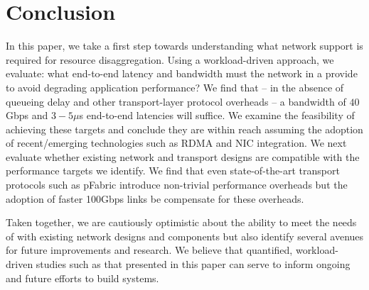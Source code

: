 \section{Conclusion}
In this paper, we take a first step towards understanding what network support is required for resource disaggregation. Using a workload-driven approach, we evaluate: what end-to-end latency and bandwidth must the network in a \dis provide to avoid degrading application performance? We find that -- in the absence of queueing delay and other transport-layer protocol overheads -- a bandwidth of $40$Gbps and $3-5\mu$s end-to-end latencies will suffice. We examine the feasibility of achieving these targets and conclude they are within reach assuming the adoption of recent/emerging technologies such as RDMA and NIC integration. We next evaluate whether existing network and transport designs are compatible with the performance targets we identify. We find that even state-of-the-art transport protocols such as pFabric introduce non-trivial performance overheads but the adoption of faster 100Gbps links be compensate for these overheads. 

Taken together, we are cautiously optimistic about the ability to meet the needs of \dis with existing network designs and components but also identify several avenues for future improvements and research. We believe that quantified, workload-driven studies such as that presented in this paper can serve to inform ongoing and future efforts to build \dis systems. 


